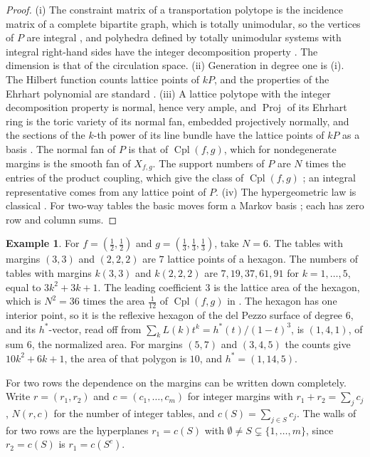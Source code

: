 \documentclass[11pt]{article}
\theoremstyle{definition}
\newtheorem{example}[theorem]{Example}
\theoremstyle{remark}
\newcommand{\Cpl}{\operatorname{Cpl}}
\begin{document}
\begin{proof}
(i) The constraint matrix of a transportation polytope is the incidence matrix of a complete bipartite graph, which is
totally unimodular, so the vertices of $P$ are integral \cite{Schrijver1986}, and polyhedra defined by totally unimodular
systems with integral right-hand sides have the integer decomposition property \cite{BaumTrotter1978}. The dimension is that of
the circulation space. (ii) Generation in degree one is (i). The Hilbert function counts lattice points of $kP$, and the
properties of the Ehrhart polynomial are standard \cite{BeckRobins2015}. (iii) A lattice polytope with the integer
decomposition property is normal, hence very ample, and $\operatorname{Proj}$ of its Ehrhart ring is the toric variety of its
normal fan, embedded projectively normally, and the sections of the $k$-th power of its line bundle have the lattice
points of $kP$ as a basis \cite[Ch.~2 and Prop.~4.3.3]{CLS2011}. The normal fan of $P$ is that of $\Cpl(f,g)$, which for
nondegenerate margins is the smooth fan of $X_{f,g}$. The support numbers of $P$ are $N$ times the entries of the product
coupling, which give the class of $\Cpl(f,g)$ \cite[Prop.~8.1]{Conditionals}; an integral representative comes from any
lattice point of $P$. (iv) The hypergeometric law is classical \cite{Agresti2013}. For two-way tables the basic moves
form a Markov basis \cite{DiaconisSturmfels1998}; each has zero row and column sums.
\end{proof}

\begin{example}\label{ex:hexagon}
For $f=(\frac12,\frac12)$ and $g=(\frac13,\frac13,\frac13)$, take $N=6$. The tables with margins $(3,3)$ and $(2,2,2)$ are
$7$ lattice points of a hexagon. The numbers of tables with margins $k(3,3)$ and $k(2,2,2)$ are $7,19,37,61,91$ for $k=1,\dots,5$,
equal to $3k^2+3k+1$. The leading coefficient $3$ is the lattice area of the hexagon, which is $N^2=36$ times the area
$\frac1{12}$ of $\Cpl(f,g)$ in \cite[\S8]{Conditionals}. The hexagon has one interior point, so it is the reflexive hexagon of the
del Pezzo surface of degree $6$, and its $h^*$-vector, read off from $\sum_k L(k)t^k=h^*(t)/(1-t)^3$, is $(1,4,1)$, of sum $6$, the
normalized area. For margins $(5,7)$ and $(3,4,5)$ the counts give $10k^2+6k+1$, the area of that polygon is $10$, and
$h^*=(1,14,5)$.
\end{example}

For two rows the dependence on the margins can be written down completely. Write $r=(r_1,r_2)$ and $c=(c_1,\dots,c_m)$ for
integer margins with $r_1+r_2=\sum_jc_j$, $N(r,c)$ for the number of integer tables, and $c(S)=\sum_{j\in S}c_j$. The walls of
\cite[Def.~6.3]{Conditionals} for two rows are the hyperplanes $r_1=c(S)$ with $\emptyset\ne S\subsetneq\{1,\dots,m\}$, since $r_2=c(S)$
is $r_1=c(S^c)$.
\end{document}
